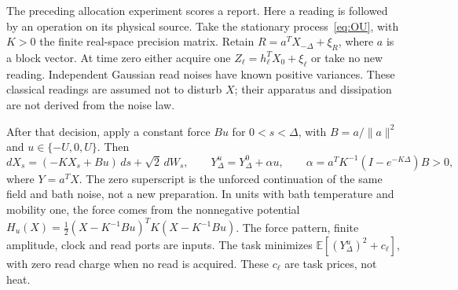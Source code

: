 \documentclass[12pt,a4paper]{article}
\newcommand{\E}{\mathbb E}
\begin{document}
The preceding allocation experiment scores a report. Here a reading
is followed by an operation on its physical source. Take the stationary
process~\eqref{eq:OU}, with $K>0$ the finite real-space precision matrix.
Retain $R=a^TX_{-\Delta}+\xi_R$, where $a$ is a block vector. At
time zero either acquire one $Z_\ell=h_\ell^TX_0+\xi_\ell$ or take
no new reading. Independent Gaussian read noises have known positive
variances. These classical readings are assumed not to disturb $X$;
their apparatus and dissipation are not derived from the noise law.

After that decision, apply a constant force $Bu$ for $0<s<\Delta$,
with $B=a/\|a\|^2$ and $u\in\{-U,0,U\}$. Then
\begin{equation}\label{eq:field-force}
 dX_s=(-KX_s+Bu)\,ds+\sqrt2\,dW_s,\qquad
 Y_\Delta^u=Y_\Delta^0+\alpha u,\qquad
 \alpha=a^TK^{-1}(I-e^{-K\Delta})B>0,
\end{equation}
where $Y=a^TX$. The zero superscript is the unforced continuation of
the same field and bath noise, not a new preparation. In units with
bath temperature and mobility one, the force comes from the
nonnegative potential
$H_u(X)=\frac12(X-K^{-1}Bu)^TK(X-K^{-1}Bu)$.
The force pattern, finite amplitude, clock and read ports are inputs.
The task minimizes $\E[(Y_\Delta^u)^2+c_\ell]$, with zero read charge
when no read is acquired. These $c_\ell$ are task prices, not heat.
\end{document}
